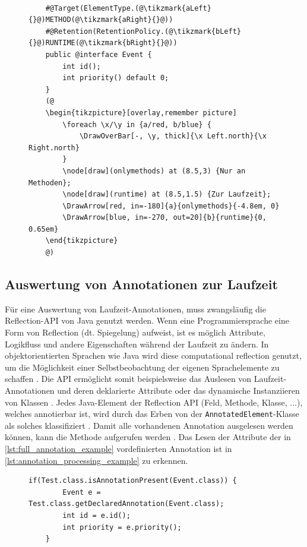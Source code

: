 \begin{figure}[H]
	\centering
	\begin{lstlisting}[caption={Beispiel einer Laufzeit Annotation}, captionpos=b, label=lst:full_annotation_example]
	
	#@Target(ElementType.(@\tikzmark{aLeft}{}@)METHOD(@\tikzmark{aRight}{}@))
	#@Retention(RetentionPolicy.(@\tikzmark{bLeft}{}@)RUNTIME(@\tikzmark{bRight}{}@))
	public @interface Event {
		int id();
		int priority() default 0;
	}
	(@
	\begin{tikzpicture}[overlay,remember picture]
		\foreach \x/\y in {a/red, b/blue} {
			\DrawOverBar[-, \y, thick]{\x Left.north}{\x Right.north}
		}
		\node[draw](onlymethods) at (8.5,3) {Nur an Methoden};
		\node[draw](runtime) at (8.5,1.5) {Zur Laufzeit};
		\DrawArrow[red, in=-180]{a}{onlymethods}{-4.8em, 0}
		\DrawArrow[blue, in=-270, out=20]{b}{runtime}{0, 0.65em}
	\end{tikzpicture}
	@)
	\end{lstlisting}
\end{figure}
\subsection{Auswertung von Annotationen zur Laufzeit}
\label{java_annotation_laufzeitauswertung}
Für eine Auswertung von Laufzeit-Annotationen, muss zwangsläufig die Reflection-API von Java genutzt werden. Wenn eine Programmiersprache eine Form von Reflection (dt. Spiegelung) aufweist, ist es möglich Attribute, Logikfluss und andere Eigenschaften während der Laufzeit zu ändern. In objektorientierten Sprachen wie Java wird diese \glqq computational reflection\grqq{} genutzt, um die Möglichkeit einer Selbstbeobachtung der eigenen Sprachelemente zu schaffen \cite{Li2017}. Die API ermöglicht somit beispielsweise das Auslesen von Laufzeit-Annotationen und deren deklarierte Attribute oder das dynamische Instanziieren von Klassen \cite{Forman2004}. Jedes Java-Element der Reflection API (Feld, Methode, Klasse, ...), welches annotierbar ist, wird durch das Erben von der \texttt{AnnotatedElement}-Klasse als solches klassifiziert \cite{Schildt2019}. Damit alle vorhandenen Annotation ausgelesen werden können, kann die Methode  aufgerufen werden \cite{Pigula2015}. Das Lesen der Attribute der in \autoref{lst:full_annotation_example} vordefinierten Annotation ist in \autoref{lst:annotation_processing_example} zu erkennen.
\begin{figure}[H]
	\begin{lstlisting}[caption={Auslesen einer Laufzeit-Annotation}, captionpos=b, label=lst:annotation_processing_example]
    if(Test.class.isAnnotationPresent(Event.class)) {
	    Event e = Test.class.getDeclaredAnnotation(Event.class);
	    int id = e.id();
	    int priority = e.priority();
    }
	\end{lstlisting}
\end{figure}
